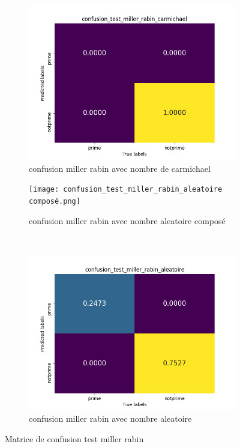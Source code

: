 \documentclass{article}
\begin{document}
\begin{figure}[H]
\begin{subfigure}{.5\linewidth}
\centering
\includegraphics[scale=0.45]{confusion_test_miller_rabin_carmichael.png}
\caption{\centering confusion miller rabin avec nombre de carmichael}
\label{fig:sub1}
\end{subfigure}%
\begin{subfigure}{.5\linewidth}
\centering
\texttt{[image: confusion\_test\_miller\_rabin\_aleatoire composé.png]}
\caption{\centering confusion miller rabin avec nombre aleatoire composé}
\label{fig:sub2}
\end{subfigure}\\
\begin{subfigure}{\linewidth}
\centering
\includegraphics[scale=0.45]{confusion_test_miller_rabin_aleatoire.png}
\caption{\centering confusion miller rabin avec nombre aleatoire}
\label{fig:sub3}
\end{subfigure}
\caption{\centering Matrice de confusion test miller rabin}
\label{fig:test}
\end{figure}
\end{document}
